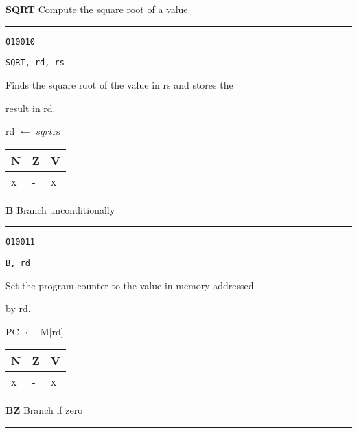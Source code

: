 \documentclass{article}
\begin{document}
\pagebreak

\flushleft
\LARGE\textbf{SQRT} \large \hfill Compute the square root of a value

\kern-3pt
\noindent\rule{16.5cm}{0.4pt}
\normalsize

{\large
	 \texttt{010010} \par
	\smallbreak
	 \texttt{SQRT, rd, rs} \par
	\smallbreak
	 Finds the square root of the value in rs and stores the\par
	\makebox[3.5cm][l]{  } result in rd. \par
	\smallbreak
	 rd $\leftarrow$ $sqrt{\textrm{rs}}$ \par
	\smallbreak
	 \begin{tabular}{lll} N \quad & Z \quad & V \\ \hline x & - & x \\ \end{tabular}
}

\bigskip\bigskip

\flushleft
\LARGE\textbf{B} \large \hfill Branch unconditionally

\kern-3pt
\noindent\rule{16.5cm}{0.4pt}
\normalsize

{\large
	 \texttt{010011} \par
	\smallbreak
	 \texttt{B, rd} \par
	\smallbreak
	 Set the program counter to the value in memory addressed  \par
	\makebox[3.5cm][l]{  } by rd. \par
	\smallbreak
	 PC $\leftarrow$ M[rd] \par
	\smallbreak
	 \begin{tabular}{lll} N \quad & Z \quad & V \\ \hline x & - & x \\ \end{tabular}
}

\bigskip\bigskip

\flushleft
\LARGE\textbf{BZ} \large \hfill Branch if zero

\kern-3pt
\noindent\rule{16.5cm}{0.4pt}
\normalsize
\end{document}
